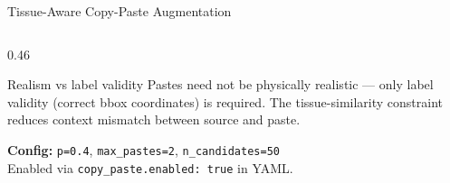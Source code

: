 \documentclass[aspectratio=169, 10pt]{beamer}
\begin{document}
\begin{frame}{Tissue-Aware Copy-Paste Augmentation}
\begin{columns}[T]
\begin{column}{0.46\textwidth}
      \vspace{4pt}
      \begin{alertblock}{\small Realism vs label validity}
        \scriptsize Pastes need not be physically realistic — only label validity (correct bbox coordinates) is required. The tissue-similarity constraint reduces context mismatch between source and paste.
      \end{alertblock}

      \vspace{4pt}
      {\small\textbf{Config:} \texttt{p=0.4}, \texttt{max\_pastes=2}, \texttt{n\_candidates=50}\\
      Enabled via \texttt{copy\_paste.enabled: true} in YAML.}
    \end{column}
  \end{columns}
\end{frame}
\end{document}
